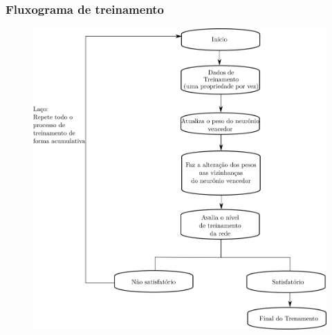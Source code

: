 \documentclass[aspectratio=10]{beamer} %
\begin{document}
\begin{frame}
\frametitle{Fluxograma de treinamento}
\begin{scriptsize}


\begin{figure}[H]
\centering

\includegraphics[scale=0.35]{Imagens/treinamento.png}
\end{figure}
\end{scriptsize}
\end{frame}
\end{document}
